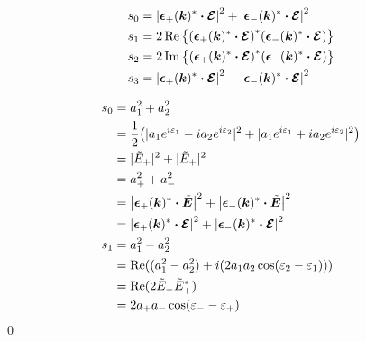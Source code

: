 \documentclass[uplatex,dvipdfmx,a4paper,11pt]{jlreq}
\makeatletter
\newcommand{\kk}{\bm{k}}
\theoremstyle{definition}
\renewenvironment{proof}[1][\proofname]{\par
  \normalfont
  \topsep6\p@\@plus6\p@ \trivlist
  \item[\hskip\labelsep{\bfseries #1}\@addpunct{\bfseries}]\ignorespaces\quad\par
}{%
  \qed\endtrivlist\@endpefalse
}
\renewcommand\proofname{証明}
\makeatother
\begin{document}
\begin{proposition}
  \begin{align}
    s_0 & = \qty|\ee_+(\kk)^*\vdot\EC|^2 + \qty|\ee_-(\kk)^*\vdot\EC|^2      \\
    s_1 & = 2\Re\qty{\qty(\ee_+(\kk)^*\vdot\EC)^*\qty(\ee_-(\kk)^*\vdot\EC)} \\
    s_2 & = 2\Im\qty{\qty(\ee_+(\kk)^*\vdot\EC)^*\qty(\ee_-(\kk)^*\vdot\EC)} \\
    s_3 & = \qty|\ee_+(\kk)^*\vdot\EC|^2 - \qty|\ee_-(\kk)^*\vdot\EC|^2
  \end{align}
\end{proposition}
\begin{proof}
  \begin{align}
    s_0 & = a_1^2 + a_2^2                                                                                                              \\
        & = \frac{1}{2}\qty(|a_1e^{i\varepsilon_1} - i a_2e^{i\varepsilon_2}|^2 + |a_1e^{i\varepsilon_1} + i a_2e^{i\varepsilon_2}|^2) \\
        & = |\tilde{E}_+|^2 + |\tilde{E}_+|^2                                                                                          \\
        & = a_+^2 + a_-^2                                                                                                              \\
        & = \qty|\ee_+(\kk)^*\vdot\ET|^2 + \qty|\ee_-(\kk)^*\vdot\ET|^2                                                                \\
        & = \qty|\ee_+(\kk)^*\vdot\EC|^2 + \qty|\ee_-(\kk)^*\vdot\EC|^2                                                                \\
    s_1 & = a_1^2 - a_2^2                                                                                                              \\
        & = \Re((a_1^2 - a_2^2) + i(2a_1a_2\cos(\varepsilon_2 - \varepsilon_1)))                                                       \\
        & = \Re(2\tilde{E}_-\tilde{E}_+^*)                                                                                             \\
        & = 2a_+a_-\cos(\varepsilon_- - \varepsilon_+)                                                                                 \\

\end{align}
\end{proof}
\end{document}
